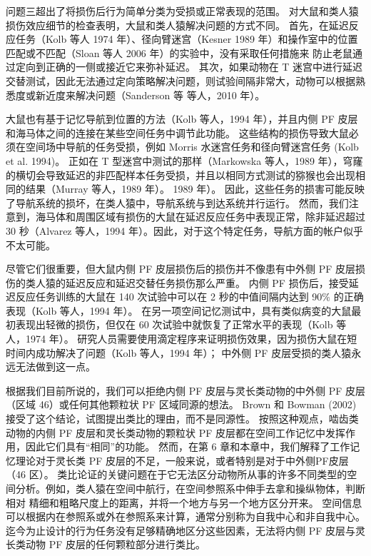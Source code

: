 \par 
问题三超出了将损伤后行为简单分类为受损或正常表现的范围。 对大鼠和类人猿损伤效应细节的检查表明，大鼠和类人猿解决问题的方式不同。 首先，在延迟反应任务（Kolb 等人 1974 年）、径向臂迷宫（Kesner 1989 年）和操作室中的位置匹配或不匹配（Sloan 等人 2006 年）的实验中，没有采取任何措施来 防止老鼠通过定向到正确的一侧或接近它来弥补延迟。 其次，如果动物在 T 迷宫中进行延迟交替测试，因此无法通过定向策略解决问题，则试验间隔非常大，动物可以根据熟悉度或新近度来解决问题（Sanderson 等 等人，2010 年）。
\par 
大鼠也有基于记忆导航到位置的方法（Kolb 等人，1994 年），并且内侧 PF 皮层和海马体之间的连接在某些空间任务中调节此功能。 这些结构的损伤导致大鼠必须在空间场中导航的任务受损，例如 Morris 水迷宫任务和径向臂迷宫任务 (Kolb et al. 1994)。 正如在 T 型迷宫中测试的那样（Markowska 等人，1989 年），穹窿的横切会导致延迟的非匹配样本任务受损，并且以相同方式测试的猕猴也会出现相同的结果（Murray 等人，1989 年）。 1989 年）。 因此，这些任务的损害可能反映了导航系统的损坏，在类人猿中，导航系统与到达系统并行运行。 然而，我们注意到，海马体和周围区域有损伤的大鼠在延迟反应任务中表现正常，除非延迟超过 30 秒（Alvarez 等人，1994 年）。因此，对于这个特定任务，导航方面的帐户似乎不太可能。
\par 
尽管它们很重要，但大鼠内侧 PF 皮层损伤后的损伤并不像患有中外侧 PF 皮层损伤的类人猿的延迟反应和延迟交替任务损伤那么严重。 内侧 PF 损伤后，接受延迟反应任务训练的大鼠在 140 次试验中可以在 2 秒的中值间隔内达到 90$\%$ 的正确表现（Kolb 等人，1994 年）。 在另一项空间记忆测试中，具有类似病变的大鼠最初表现出轻微的损伤，但仅在 60 次试验中就恢复了正常水平的表现（Kolb 等人，1974 年）。 研究人员需要使用滴定程序来证明损伤效果，因为损伤大鼠在短时间内成功解决了问题（Kolb 等人，1994 年）； 中外侧 PF 皮层受损的类人猿永远无法做到这一点。
\par 
根据我们目前所说的，我们可以拒绝内侧 PF 皮层与灵长类动物的中外侧 PF 皮层（区域 46）或任何其他颗粒状 PF 区域同源的想法。 Brown 和 Bowman (2002) 接受了这个结论，试图提出类比的理由，而不是同源性。 按照这种观点，啮齿类动物的内侧 PF 皮层和灵长类动物的颗粒状 PF 皮层都在空间工作记忆中发挥作用，因此它们具有“相同”的功能。 然而，在第 6 章和本章中，我们解释了工作记忆理论对于灵长类 PF 皮层的不足，一般来说，或者特别是对于中外侧PF皮层（46 区）。 类比论证的关键问题在于它无法区分动物所从事的许多不同类型的空间分析。例如，类人猿在空间中航行，在空间参照系中伸手去拿和操纵物体，判断相对 精细和粗略尺度上的距离，并将一个地方与另一个地方区分开来。 空间信息可以根据内在参照系或外在参照系来计算，通常分别称为自我中心和非自我中心。 迄今为止设计的行为任务没有足够精确地区分这些因素，无法将内侧 PF 皮层与灵长类动物 PF 皮层的任何颗粒部分进行类比。
